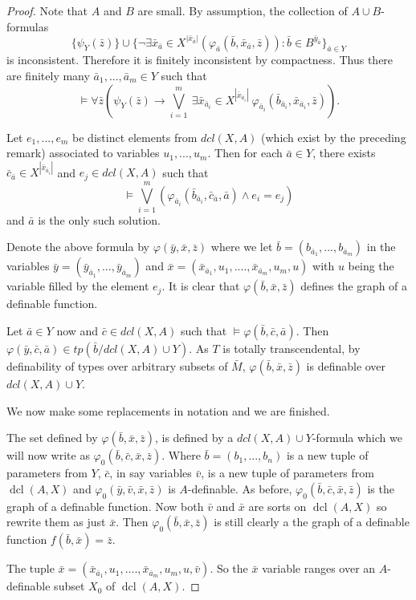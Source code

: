 \documentclass{amsart}
\theoremstyle{definition}
\theoremstyle{remark}
\numberwithin{equation}{section}
\def \tp {tp}
\def \dcl {\operatorname{dcl}}
\begin{document}
\begin{proof}
Note that $A$ and $B$ are small.  By assumption, the collection of $A\cup B$-formulas $$\{\psi_Y(\bar{z})\} \cup \{\neg \exists \bar{x}_{\bar{a}} \in X^{|\bar{x}_{\bar{a}}|}(\varphi_{\bar{a}}(\bar{b},\bar{x}_{\bar{a}},\bar{z})) : \bar{b} \in B^{\bar{y}_{\bar{a}}}\}_{\bar{a} \in Y}$$ is inconsistent. Therefore it is finitely inconsistent by compactness. Thus there are finitely many $\bar{a}_1,...,\bar{a}_m \in Y$ such that $$\models \forall \bar{z} \left( \psi_Y(\bar{z}) \rightarrow \bigvee_{i=1}^m \ \exists \bar{x}_{\bar{a}_i} \in X^{|\bar{x}_{\bar{a}_i}|} \  \varphi_{\bar{a}_i}(\bar{b}_{\bar{a}_i},\bar{x}_{\bar{a}_i},\bar{z})\right).$$ 

Let $e_1,...,e_m$ be distinct elements from $dcl(X,A)$ (which exist by the preceding remark) associated to variables $u_1,...,u_m$. Then for each $\bar{a} \in Y$, there exists $\bar{c}_{\bar{a}} \in X^{|\bar{x}_{\bar{a}_i}|}$ and $e_j \in dcl(X,A)$ such that $$\models\bigvee_{i=1}^m (\varphi_{\bar{a}_i}(\bar{b}_{\bar{a}_i},\bar{c}_{\bar{a}},\bar{a}) \wedge e_i=e_j)$$ and $\bar{a}$ is the only such solution.

Denote the above formula by $\varphi(\bar{y},\bar{x},\bar{z})$ where
we let $\bar{b} =(b_{\bar{a}_1},...,b_{\bar{a}_m})$ in the variables $\bar{y} = (\bar{y}_{\bar{a}_1},...,\bar{y}_{\bar{a}_m})$ and $\bar{x} = (\bar{x}_{\bar{a}_1},u_1,....,\bar{x}_{\bar{a}_m},u_m, u)$ with $u$ being the variable filled by the element $e_j$. It is clear that $\varphi(\bar{b}, \bar{x},\bar{z})$ defines the graph of a definable function.

Let $\bar{a} \in Y$ now and $\bar{c} \in dcl(X,A)$ such that $\models \varphi(\bar{b},\bar{c},\bar{a})$. Then $\varphi(\bar{y},\bar{c},\bar{a}) \in \tp(\bar{b}/dcl(X,A)\cup Y)$. As $T$ is totally transcendental, by definability of types over arbitrary subsets of $\bar{M}$, $\varphi(\bar{b},\bar{x},\bar{z})$ is definable over $dcl(X,A) \cup Y$. 

We now make some replacements in notation and we are finished. 

The set defined by $\varphi(\bar{b},\bar{x},\bar{z})$, is defined by a $dcl(X,A) \cup Y$-formula which we will now write as $\varphi_0(\bar{b},\bar{c}, \bar{x},\bar{z})$. Where $\bar{b}=(b_1,...,b_n)$ is a new tuple of parameters from $Y$, $\bar{c}$, in say variables $\bar{v}$, is a new tuple of parameters from $\dcl(A,X)$ and $\varphi_0(\bar{y},\bar{v},\bar{x}, \bar{z})$ is $A$-definable. As before, $\varphi_0(\bar{b},\bar{c},\bar{x}, \bar{z})$ is the graph of a definable function. Now both $\bar{v}$ and $\bar{x}$ are sorts on $\dcl(A,X)$ so rewrite them as just $\bar{x}$. Then $\varphi_0(\bar{b},\bar{x},\bar{z})$ is still clearly a the graph of a definable function $f(\bar{b},\bar{x}) = \bar{z}$.

The tuple $\bar{x} = (\bar{x}_{\bar{a}_1},u_1,....,\bar{x}_{\bar{a}_m},u_m,u,\bar{v})$. So the $\bar{x}$ variable ranges over an $A$-definable subset $X_0$ of $\dcl(A,X)$.
\end{proof}
\end{document}
